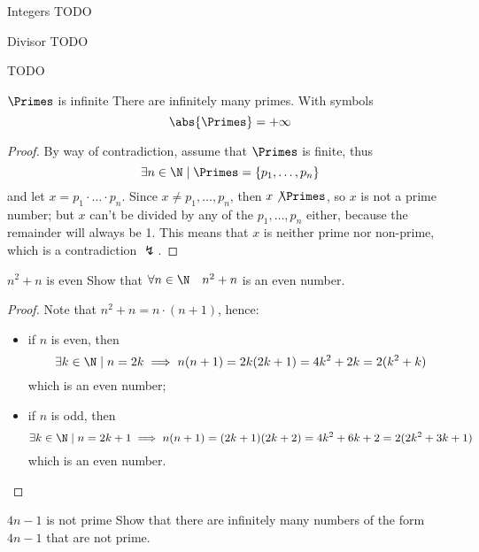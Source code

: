 \documentclass[a4paper, 12pt]{report}
\begin{document}
    \begin{frameddefn}{Integers}
        TODO
    \end{frameddefn}

    \begin{frameddefn}{Divisor}
        TODO
    \end{frameddefn}

    \begin{example}[Divisors]
        TODO
    \end{example}

    \begin{framedprop}{$\Primes$ is infinite}
        There are infinitely many primes. With symbols $$\abs{\Primes} = + \infty$$
    \end{framedprop}

    \begin{proof}
        By way of contradiction, assume that $\Primes$ is finite, thus $$\exists n \in \N \mid \Primes = \{p_1, \ldots, p_n\}$$ and let $x = p_1 \cdot \ldots \cdot p_n$. Since $x \neq p_1, \ldots, p_n$, then $x \not \Primes$, so $x$ is not a prime number; but $x$ can't be divided by any of the $p_1, \ldots, p_n$ either, because the remainder will always be 1. This means that $x$ is neither prime nor non-prime, which is a contradiction $\lightning$.
    \end{proof}

    \begin{framedprob}{$n^2 + n$ is even}
        Show that $\forall n \in \N \quad n^2 + n$ is an even number.
    \end{framedprob}

    \begin{proof}
        Note that $n^2 + n = n \cdot (n + 1)$, hence:

        \begin{itemize}
            \item if $n$ is even, then $$\exists k \in \N \mid n = 2k \implies n(n + 1) = 2k(2k + 1) =4k^2 + 2k = 2(k^2+k)$$ which is an even number;
            \item if $n$ is odd, then $$\exists k \in \N \mid n = 2k + 1 \implies n(n + 1) = (2k + 1)(2k + 2) = 4k^2 + 6k + 2 = 2(2k^2 + 3k +1)$$ which is an even number.
        \end{itemize}
    \end{proof}

    \begin{framedprob}{$4n -1$ is not prime}
        Show that there are infinitely many numbers of the form $4n -1$ that are not prime.
    \end{framedprob}
    
\end{document}
